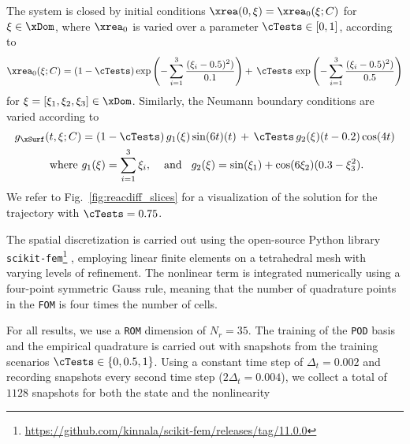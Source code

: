\documentclass[onefignum,onetabnum]{siamart251104}
\newcommand{\Nr}{{N_r}}
\newcommand{\xp}{{\xi}} %
\newcommand{\acro}[1]{{\texttt{#1}}}  %
\begin{document}
The system is closed by initial conditions $\xrea(0,\xp) = \xrea_0(\xp;C)$ for $\xp \in \xDom$, where $\xrea_0$ is varied over a parameter $\cTests \in [0,1]$, according to
{\small
\begin{align*}
 \xrea_0(\xp;C) = (1-\cTests)   \exp \left( -\sum_{i=1}^3 \frac{(\xp_i - 0.5)^2)}{0.1} \right)  + \, \cTests \,\exp \left( -\sum_{i=1}^3 \frac{(\xp_i - 0.5)^2)}{0.5} \right)
\end{align*}
}
for  $\xp=[\xp_1,\xp_2,\xp_3] \in \xDom$. Similarly, the Neumann boundary conditions are varied according to
{\small
\begin{align*}
g_{\xSurf}(t,\xp;C) &= (1-\cTests)  \, g_{1}(\xp) \sin(6  t)(t) \, + \, \cTests \, g_{2}(\xp) (t - 0.2) \cos(4t)\\
\text{where }& g_{1}(\xp) = \sum_{i=1}^3 \xp_i, \hspace{0.4cm} \text{and} \hspace{0.3cm}
	g_{2}(\xp) = \sin(\xp_1) + \cos(6 \xp_2) (0.3-\xp_3^2).
\end{align*}
}
We refer to Fig.~\ref{fig:reacdiff_slices} for a visualization of the solution for the trajectory with $\cTests =0.75$.

The spatial discretization is carried out using the open-source Python library \acro{scikit{\-}-fem}\footnote{\url{https://github.com/kinnala/scikit-fem/releases/tag/11.0.0}} \cite{skfem2020}, employing linear finite elements on a tetrahedral mesh with varying levels of refinement. The nonlinear term is integrated numerically using a four-point symmetric Gauss rule, meaning that the number of quadrature points in the \acro{FOM} is four times the number of cells.

For all results, we use a \acro{ROM} dimension of $\Nr=35$. The training of the \acro{POD} basis and the empirical quadrature is carried out with snapshots from the training scenarios $\cTests \in \{0, 0.5, 1\}$. Using a constant time step of $\Delta_t = 0.002$ and recording snapshots every second time step ($2\Delta_t = 0.004$), we collect a total of $1128$ snapshots for both the state and the nonlinearity
\end{document}
